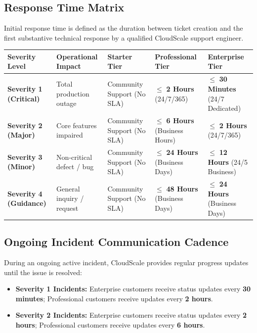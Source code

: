 \documentclass[10pt,letterpaper]{article}
\begin{document}
\subsection{Response Time Matrix}
Initial response time is defined as the duration between ticket creation and the first substantive technical response by a qualified CloudScale support engineer.

\vspace{1pt}
{\centering
\small
\renewcommand{\arraystretch}{1.08}
\begin{tabularx}{\linewidth}{@{}l p{3.2cm} X X X@{}}
\toprule
\rowcolor{tablehead}
\color{white}\textbf{Severity Level} & \color{white}\textbf{Operational Impact} & \color{white}\textbf{Starter Tier} & \color{white}\textbf{Professional Tier} & \color{white}\textbf{Enterprise Tier} \\
\midrule
\rowcolor{rowalt}
\textbf{Severity 1 (Critical)} & Total production outage & Community Support (No SLA) & $\le$ \textbf{2 Hours} (24/7/365) & $\le$ \textbf{30 Minutes} (24/7 Dedicated) \\
\textbf{Severity 2 (Major)} & Core features impaired & Community Support (No SLA) & $\le$ \textbf{6 Hours} (Business Hours) & $\le$ \textbf{2 Hours} (24/7/365) \\
\rowcolor{rowalt}
\textbf{Severity 3 (Minor)} & Non-critical defect / bug & Community Support (No SLA) & $\le$ \textbf{24 Hours} (Business Days) & $\le$ \textbf{12 Hours} (24/5 Business) \\
\textbf{Severity 4 (Guidance)} & General inquiry / request & Community Support (No SLA) & $\le$ \textbf{48 Hours} (Business Days) & $\le$ \textbf{24 Hours} (Business Days) \\
\bottomrule
\end{tabularx}
\label{tab:response-matrix}
\par}

\subsection{Ongoing Incident Communication Cadence}
During an ongoing active incident, CloudScale provides regular progress updates until the issue is resolved:
\begin{itemize}[leftmargin=1.5em, itemsep=0.5pt, topsep=1pt]
  \item \textbf{Severity 1 Incidents:} Enterprise customers receive status updates every \textbf{30 minutes}; Professional customers receive updates every \textbf{2 hours}.
  \item \textbf{Severity 2 Incidents:} Enterprise customers receive status updates every \textbf{2 hours}; Professional customers receive updates every \textbf{6 hours}.
\end{itemize}
\end{document}
